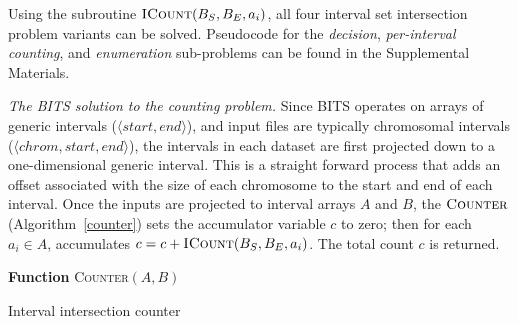 \documentclass{bioinfo}
\begin{document}
Using the subroutine $\textsc{ICount}(B_S,B_E,a_i)$, all four interval set 
intersection problem variants can be solved. Pseudocode for the \emph{decision}, 
\emph{per-interval counting}, and \emph{enumeration} sub-problems can be found 
in the Supplemental Materials.


	{\em The BITS solution to the counting problem.}
	Since BITS operates on arrays of generic intervals 
	($\langle start,end \rangle$), and
	input files are typically chromosomal intervals 
	($\langle chrom,start,end \rangle$), the intervals in each
	dataset are first projected down to a one-dimensional generic interval.  
	This is a straight forward process that adds an offset associated with 
	the size of each chromosome to the start and end of
	each interval.  Once the inputs are projected to interval arrays $A$ and
	$B$, the $\textsc{Counter}$ (Algorithm~\ref{counter}) sets the accumulator
	variable $c$ to zero; then
	for each $a_i \in A$, accumulates $c = c + \textsc{ICount}(B_S,B_E,a_i)$.
	The total count $c$ is returned.
	\begin{algorithm}[h]
		\DontPrintSemicolon
		\footnotesize
		\BlankLine
		\textbf{Function} \textsc{Counter}$(A,B)$
		\caption{Interval intersection counter}
		\label{counter}
	\end{algorithm}
	
\end{document}
